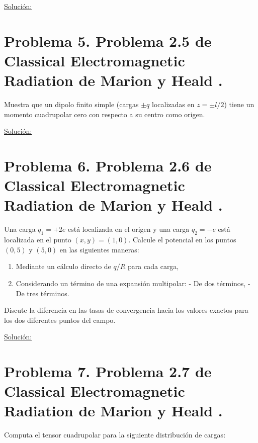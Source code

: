 \documentclass[a4paper,11pt]{article}
\numberwithin{equation}{section}
\begin{document}
\underline{Solución:} \vspace{.3cm}

\section{Problema 5. Problema 2.5 de Classical Electromagnetic Radiation
de Marion y Heald \cite{marion2}.}

Muestra que un dipolo finito simple (cargas $\pm q$ localizadas en $z = \pm l/2$) 
tiene un momento cuadrupolar cero con respecto a su centro como origen.

\vspace{.3cm}

\underline{Solución:} \vspace{.3cm}

\section{Problema 6. Problema 2.6 de Classical Electromagnetic Radiation
de Marion y Heald \cite{marion2}.}

Una carga $q_1 = + 2e$ está localizada en el origen y una carga $q_2 = - e$ está 
localizada en el punto $(x,y) = (1,0)$. Calcule el potencial en los puntos $(0,5)$
y $(5,0)$ en las siguientes maneras:

\begin{enumerate}[label=\textbf{(\alph*)}]
\item Mediante un cálculo directo de $q/R$ para cada carga,
\item Considerando un término de una expansión multipolar:
\subitem - De dos términos,
\subitem - De tres términos.
\end{enumerate}

Discute la diferencia en las tasas de convergencia hacia los valores exactos para 
los dos diferentes puntos del campo.

\vspace{.3cm}

\underline{Solución:} \vspace{.3cm}

\section{Problema 7. Problema 2.7 de Classical Electromagnetic Radiation
de Marion y Heald \cite{marion2}.}

Computa el tensor cuadrupolar para la siguiente distribución de cargas:
\end{document}
